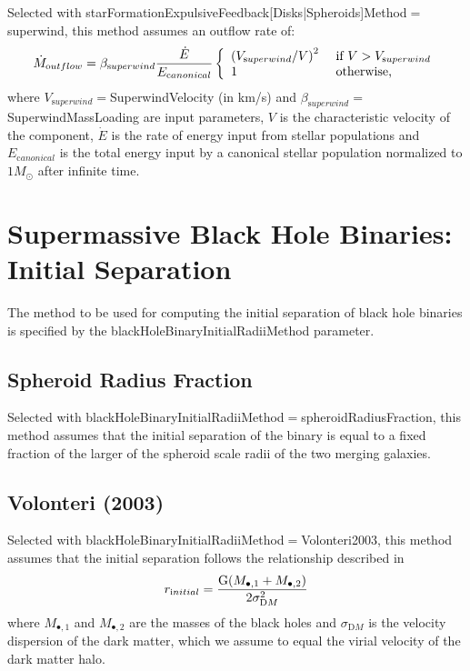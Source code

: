 Selected with {\normalfont \ttfamily starFormationExpulsiveFeedback[Disks|Spheroids]Method}$=${\normalfont \ttfamily superwind}, this method assumes an outflow rate of:
\begin{equation}
 \dot{M}_{\mathrm outflow} =  \beta_{\mathrm superwind} {\dot{E} \over E_{\mathrm canonical}} \left\{ \begin{array}{ll} \left( V_{\mathrm superwind}/V\right)^2 & \hbox{ if } V > V_{\mathrm superwind} \\ 1 & \hbox{ otherwise,} \end{array} \right.
\end{equation}
where $V_{\mathrm superwind}=${\normalfont {}SuperwindVelocity} (in km/s) and $\beta_{\mathrm superwind}=${\normalfont {}SuperwindMassLoading} are input parameters, $V$ is the characteristic velocity of the component, $\dot{E}$ is the rate of energy input from stellar populations and $E_{\mathrm canonical}$ is the total energy input by a canonical stellar population normalized to $1 M_\odot$ after infinite time.

\section{Supermassive Black Hole Binaries: Initial Separation}\label{sec:blackHoleBinaryInitialRadii}

The method to be used for computing the initial separation of black hole binaries is specified by the {\normalfont \ttfamily blackHoleBinaryInitialRadiiMethod} parameter.

\subsection{Spheroid Radius Fraction}

Selected with {\normalfont \ttfamily blackHoleBinaryInitialRadiiMethod}$=${\normalfont \ttfamily spheroidRadiusFraction}, this method assumes that the initial separation of the binary is equal to a fixed fraction {\normalfont \ttfamily [blackHoleInitialRadiusSpheroidRadiusRatio]} of the larger of the spheroid scale radii of the two merging galaxies.

\subsection{Volonteri (2003)}

Selected with {\normalfont \ttfamily blackHoleBinaryInitialRadiiMethod}$=${\normalfont \ttfamily Volonteri2003}, this method assumes that the initial separation follows the relationship described in \cite{volonteri_assembly_2003} 
\begin{equation}
 r_{\mathrm initial} = { {\mathrm G} (M_{\bullet,1} + M_{\bullet, 2}) \over 2
\sigma_{\mathrm DM}^2 }
\end{equation}
where $M_{\bullet, 1}$ and $M_{\bullet, 2}$ are the masses of the black holes
and $\sigma_{\mathrm DM}$ is the velocity dispersion of the dark matter, which we
assume to equal the virial velocity of the dark matter halo.

